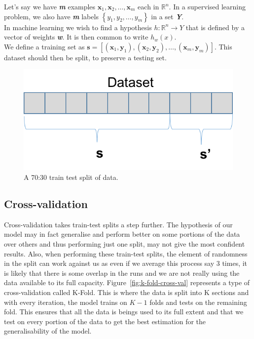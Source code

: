 \documentclass[12pt,a4paper,twoside]{report}
\begin{document}
Let's say we have \textbf{\textit{m}} examples $ \mathbf { x } _ { 1} ,\mathbf { x } _ { 2} ,\dots ,\mathbf { x } _ { m }$ each in $\mathbb { R } ^ { n }$. In a supervised learning problem, we also have \textbf{\textit{m}} labels $\left\{ y _ { 1} ,y _ { 2} ,\dots ,y _ { m } \right\}$ in a set \textbf{\textit{Y}}.\\
In machine learning we wish to find a hypothesis $h : \mathbb { R } ^ { n } \rightarrow Y$ that is defined by a vector of weights \textbf{\textit{w}}. It is then common to write $h _ { w } ( x )$.\\

We define a training set as $\mathbf{s} = [(\mathbf { x } _ { 1}, \mathbf { y } _ { 1}),(\mathbf { x } _ { 2}, \mathbf { y } _ { 2}),\dots,(\mathbf { x } _ { m}, \mathbf { y } _ { m})]$. This dataset should then be split, to preserve a testing set.
 
\begin{figure}[H]

\centering
\includegraphics[scale=0.8]{train-test-split}
\caption{A 70:30 train test split of data.}
\end{figure}

\subsection{Cross-validation}

Cross-validation takes train-test splits a step further. The hypothesis of our model may in fact generalise and perform better on some portions of the data over others and thus performing just one split, may not give the most confident results. Also, when performing these train-test splits, the element of randomness in the split can work against us as even if we average this process say 3 times, it is likely that there is some overlap in the runs and we are not really using the data available to its full capacity. Figure~\ref{fig:k-fold-cross-val} represents a type of cross-validation called K-Fold. This is where the data is split into K sections and with every iteration, the model trains on $K-1$ folds and tests on the remaining fold. This ensures that all the data is beings used to its full extent and that we test on every portion of the data to get the best estimation for the generalisability of the model.
\end{document}
